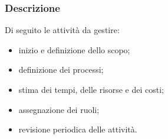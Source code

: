 \subsubsection{Descrizione} Di seguito le attività da gestire:
\begin{itemize}
	\item{inizio e definizione dello scopo;}
	\item{definizione dei processi;}
	\item{stima dei tempi, delle risorse e dei costi;}
	\item{assegnazione dei ruoli;}
	\item{revisione periodica delle attività.}
\end{itemize}